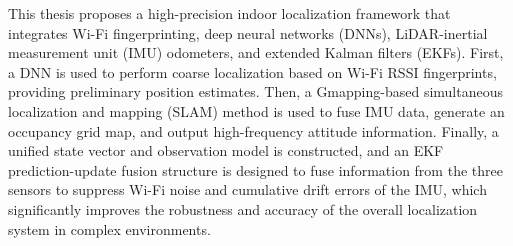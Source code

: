 \documentclass[12pt,a4paper]{article}
\numberwithin{equation}{section}
\begin{document}
This thesis proposes a high-precision indoor localization framework that
integrates Wi-Fi fingerprinting, deep neural networks (DNNs), LiDAR-inertial
measurement unit (IMU) odometers, and extended Kalman filters (EKFs). First, a
DNN is used to perform coarse localization based on Wi-Fi RSSI fingerprints,
providing preliminary position estimates. Then, a Gmapping-based simultaneous
localization and mapping (SLAM) method is used to fuse IMU data, generate an
occupancy grid map, and output high-frequency attitude information. Finally, a
unified state vector and observation model is constructed, and an EKF
prediction-update fusion structure is designed to fuse information from the
three sensors to suppress Wi-Fi noise and cumulative drift errors of the IMU,
which significantly improves the robustness and accuracy of the overall
localization system in complex environments.

%
%
%
%
%
%
\end{document}
